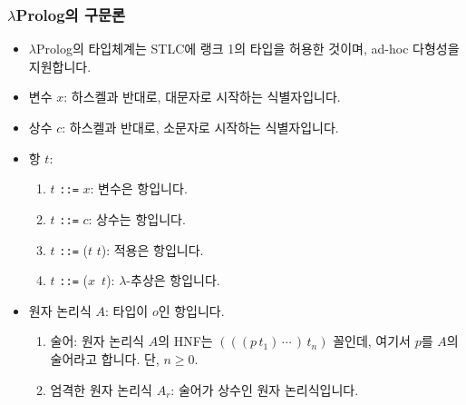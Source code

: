 \documentclass[slidestop,compress,mathserif]{beamer}
\begin{document}
    \begin{frame}
        \frametitle{$\lambda$Prolog의 구문론}
        \begin{itemize}
            \item $\lambda$Prolog의 타입체계는 STLC에 랭크 1의 타입을 허용한 것이며, ad-hoc 다형성을 지원합니다.
            \item 변수 $x$: 하스켈과 반대로, 대문자로 시작하는 식별자입니다.
            \item 상수 $c$: 하스켈과 반대로, 소문자로 시작하는 식별자입니다.
            \item 항 $t$:
            \begin{enumerate}
                \item $t$ \texttt{::=} $x$: 변수은 항입니다.
                \item $t$ \texttt{::=} $c$: 상수는 항입니다.
                \item $t$ \texttt{::=} ($t$ $t$): 적용은 항입니다.
                \item $t$ \texttt{::=} ($x$\texttt{\string\ }$t$): $\lambda$-추상은 항입니다.
            \end{enumerate}
            \item 원자 논리식 $A$: 타입이 $o$인 항입니다.
            \begin{enumerate}
                \item 술어: 원자 논리식 $A$의 HNF는 $\left( \left( \left( p \, t_1 \right) \, \cdots \, \right) \, t_n \right)$ 꼴인데, 여기서 $p$를 $A$의 술어라고 합니다. 단, $n \geq 0$.
                \item 엄격한 원자 논리식 $A_r$: 술어가 상수인 원자 논리식입니다.
            \end{enumerate}
        \end{itemize}
    \end{frame}
\end{document}
